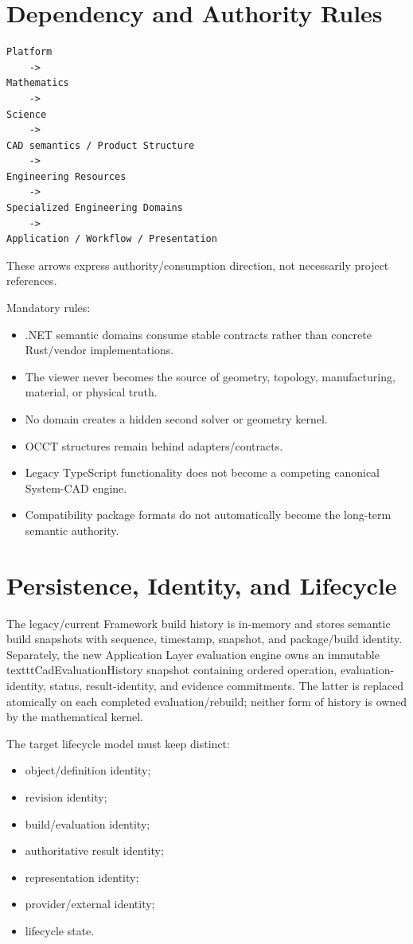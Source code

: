\documentclass[11pt,a4paper]{report}
\begin{document}
\chapter{Dependency and Authority Rules}

\begin{lstlisting}
Platform
    ->
Mathematics
    ->
Science
    ->
CAD semantics / Product Structure
    ->
Engineering Resources
    ->
Specialized Engineering Domains
    ->
Application / Workflow / Presentation
\end{lstlisting}

These arrows express authority/consumption direction, not necessarily project references.

Mandatory rules:
\begin{itemize}
\item .NET semantic domains consume stable contracts rather than concrete Rust/vendor implementations.
\item The viewer never becomes the source of geometry, topology, manufacturing, material, or physical truth.
\item No domain creates a hidden second solver or geometry kernel.
\item OCCT structures remain behind adapters/contracts.
\item Legacy TypeScript functionality does not become a competing canonical System-CAD engine.
\item Compatibility package formats do not automatically become the long-term semantic authority.
\end{itemize}

\chapter{Persistence, Identity, and Lifecycle}

The legacy/current Framework build history is in-memory and stores semantic build snapshots with sequence, timestamp, snapshot, and package/build identity. Separately, the new Application Layer evaluation engine owns an immutable \\texttt{CadEvaluationHistory} snapshot containing ordered operation, evaluation-identity, status, result-identity, and evidence commitments. The latter is replaced atomically on each completed evaluation/rebuild; neither form of history is owned by the mathematical kernel.

The target lifecycle model must keep distinct:
\begin{itemize}
\item object/definition identity;
\item revision identity;
\item build/evaluation identity;
\item authoritative result identity;
\item representation identity;
\item provider/external identity;
\item lifecycle state.
\end{itemize}
\end{document}
